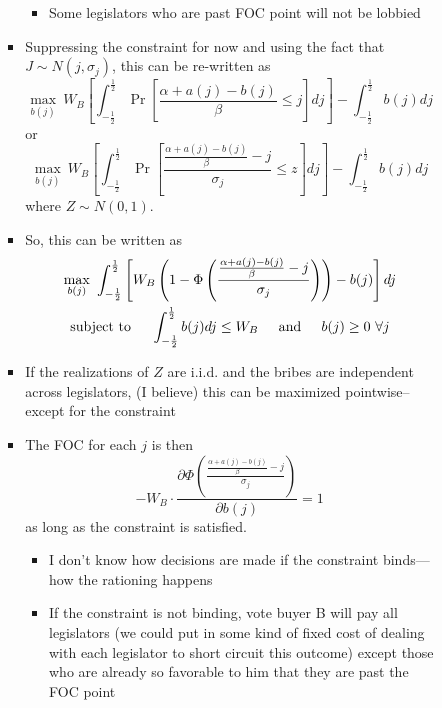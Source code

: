 \documentclass[12pt]{article}
\begin{document}
\begin{enumerate}
\begin{itemize}
\begin{itemize}
\begin{itemize}
\begin{itemize}
										\item Some legislators who are past FOC point will not be lobbied
									\end{itemize}
							\item Suppressing the constraint for now and using the fact that $J \sim N(j,\sigma_j)$, this can be re-written as
								\begin{equation}
									\max_{b(j)} \ W_B \left[ \int_{-\frac{1}{2}}^\frac{1}{2} \Pr \left[\frac{\alpha + a(j) - b(j)}{\beta} \leq j \right] dj \right] - \int_{-\frac{1}{2}}^\frac{1}{2} b(j) dj
								\end{equation}
								or
								\begin{equation}
									\max_{b(j)} \ W_B \left[ \int_{-\frac{1}{2}}^\frac{1}{2} \Pr \left[\frac{\frac{\alpha + a(j) - b(j)}{\beta} - j}{\sigma_j} \leq z \right] dj \right] - \int_{-\frac{1}{2}}^\frac{1}{2} b(j) dj
								\end{equation}
								where $Z \sim N(0,1)$. \\
							\item	So, this can be written as
								\begin{multline}
									\max_{b(j)} \ \int_{-\frac{1}{2}}^\frac{1}{2} \left[ W_B \left(1- \Phi \left(\frac{\frac{\alpha + a(j) - b(j)}{\beta} - j}{\sigma_j} \right)\right) - b(j) \right] dj \\
									\text{subject to} \hskip.2in \int_{-\frac{1}{2}}^\frac{1}{2} b(j) dj \leq W_B  \hskip.2in \text{and} \hskip.2in b(j)\geq0 \ \forall j
									\label{ex:objB}
								\end{multline}
							\item If the realizations of $Z$ are i.i.d. and the bribes are independent across legislators, (I believe) this can be maximized pointwise--except for the constraint
							\item The FOC for each $j$ is then
								\begin{equation}
								  - W_B \cdot \frac{ \partial \Phi \left(\frac{\frac{\alpha + a(j) - b(j)}{\beta} - j}{\sigma_j} \right)}{\partial b(j)} = 1
									\label{eq:foc}
								\end{equation}
								as long as the constraint is satisfied.
									\begin{itemize}
										\item I don't know how decisions are made if the constraint binds---how the rationing happens
										\item If the constraint is not binding, vote buyer B will pay all legislators (we could put in some kind of fixed cost of dealing with each legislator to short circuit this outcome) except those who are already so favorable to him that they are past the FOC point

\end{itemize}
\end{itemize}
\end{itemize}
\end{itemize}
\end{enumerate}
\end{document}
